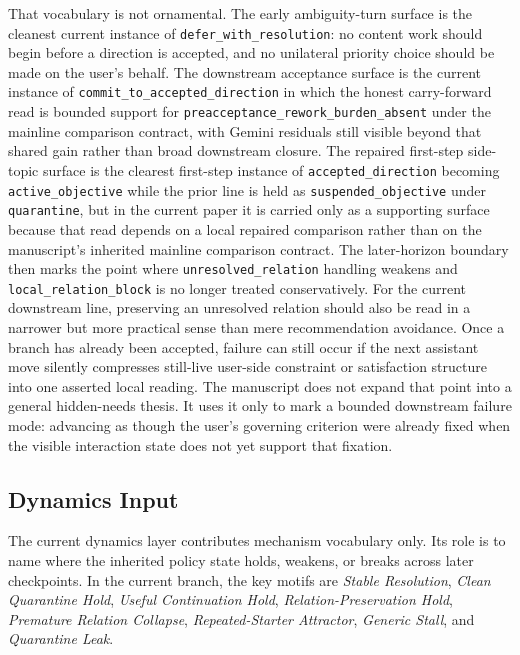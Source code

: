 \documentclass[11pt]{article}
\begin{document}
That vocabulary is not ornamental. The early ambiguity-turn surface is the
cleanest current instance of \texttt{defer\_with\_resolution}: no content work
should begin before a direction is accepted, and no unilateral priority choice
should be made on the user's behalf. The downstream acceptance surface is the
current instance of \texttt{commit\_to\_accepted\_direction} in which the
honest carry-forward read is bounded support for
\texttt{preacceptance\_rework\_burden\_absent} under the mainline comparison
contract, with Gemini residuals still visible beyond that shared gain rather
than broad downstream closure. The
repaired first-step side-topic surface is the clearest
first-step instance of \texttt{accepted\_direction} becoming
\texttt{active\_objective} while the prior line is held as
\texttt{suspended\_objective} under \texttt{quarantine}, but in the current
paper it is carried only as a supporting surface because that read depends on a
local repaired comparison rather than on the manuscript's inherited mainline
comparison contract. The later-horizon
boundary then marks the point where \texttt{unresolved\_relation} handling
weakens and \texttt{local\_relation\_block} is no longer treated conservatively.
For the current downstream line, preserving an unresolved relation should also
be read in a narrower but more practical sense than mere recommendation
avoidance. Once a branch has already been accepted, failure can still occur if
the next assistant move silently compresses still-live user-side constraint or
satisfaction structure into one asserted local reading. The manuscript does not
expand that point into a general hidden-needs thesis. It uses it only to mark a
bounded downstream failure mode: advancing as though the user's governing
criterion were already fixed when the visible interaction state does not yet
support that fixation.

\subsection{Dynamics Input}

The current dynamics layer contributes mechanism vocabulary only. Its role is to
name where the inherited policy state holds, weakens, or breaks across later
checkpoints. In the current branch, the key motifs are \textit{Stable
Resolution}, \textit{Clean Quarantine Hold}, \textit{Useful Continuation Hold},
\textit{Relation-Preservation Hold}, \textit{Premature Relation Collapse},
\textit{Repeated-Starter Attractor}, \textit{Generic Stall}, and
\textit{Quarantine Leak}.
\end{document}
